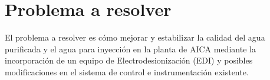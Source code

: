 \section*{Problema a resolver}
El problema a resolver es cómo mejorar y estabilizar la calidad del agua purificada y el agua para inyección en la planta de AICA mediante la incorporación de un equipo de Electrodesionización (EDI) y posibles modificaciones en el sistema de control e instrumentación existente.\\